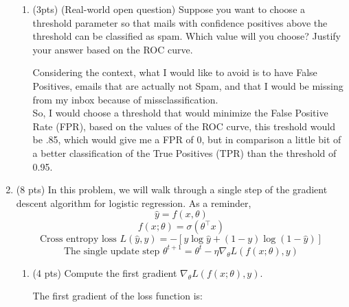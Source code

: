 \documentclass[a4paper]{article}
\theoremstyle{definition}
\newenvironment{soln}{
    \leavevmode\color{blue}\ignorespaces
}{}
\begin{document}
\begin{enumerate}
\begin{enumerate}
	\item (3pts) (Real-world open question) Suppose you want to choose a threshold parameter so that mails with confidence positives above the threshold can be classified as spam. Which value will you choose? Justify your answer based on the ROC curve.
	
	\begin{soln} 
		Considering the context, what I would like to avoid is to have False Positives, emails that are actually not Spam, and that I would be missing from my inbox because of missclassification.\\
		So, I would choose a threshold that would minimize the False Positive Rate (FPR), based on the values of the ROC curve, this treshold would be .85, which would give me a FPR of 0, but in comparison a little bit of a better classification of the True Positives (TPR) than the threshold of 0.95. \end{soln}
\end{enumerate}

\item (8 pts) In this problem, we will walk through a single step of the gradient descent algorithm for logistic regression. As a reminder,
$$\hat{y} = f(x, \theta)$$
$$f(x;\theta) = \sigma(\theta^\top x)$$
$$\text{Cross entropy loss } L(\hat{y}, y) = -[y \log  \hat{y} + (1-y)\log(1-\hat{y})]$$
$$\text{The single update step } \theta^{t+1} = \theta^{t} - \eta \nabla_{\theta} L(f(x;\theta), y) $$



\begin{enumerate}
	\item (4 pts) Compute the first gradient $\nabla_{\theta} L(f(x;\theta), y)$.
	
	\begin{soln}  The first gradient of the loss function is:


\end{soln}
\end{enumerate}
\end{enumerate}
\end{document}
